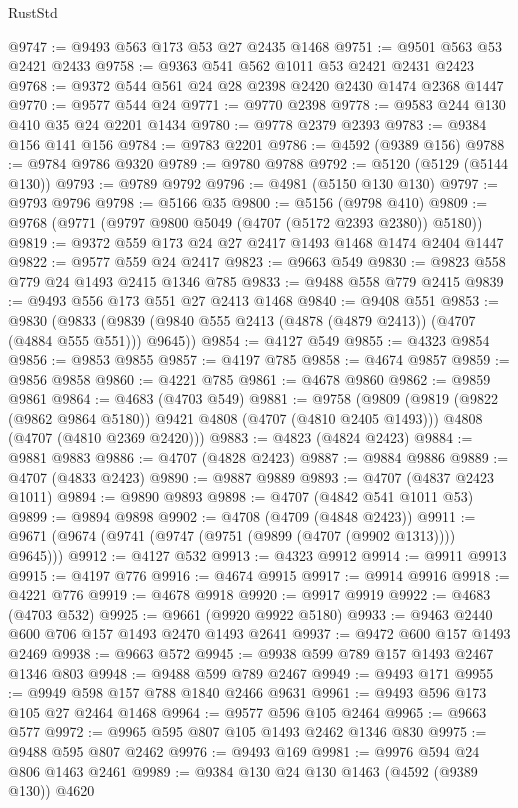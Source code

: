 \begin{lexlean}{RustStd}
\begin{coremodule}
@9747 := @9493 @563 @173 @53 @27 @2435 @1468
@9751 := @9501 @563 @53 @2421 @2433
@9758 := @9363 @541 @562 @1011 @53 @2421 @2431 @2423
@9768 := @9372 @544 @561 @24 @28 @2398 @2420 @2430 @1474 @2368 @1447
@9770 := @9577 @544 @24
@9771 := @9770 @2398
@9778 := @9583 @244 @130 @410 @35 @24 @2201 @1434
@9780 := @9778 @2379 @2393
@9783 := @9384 @156 @141 @156
@9784 := @9783 @2201
@9786 := @4592 (@9389 @156)
@9788 := @9784 @9786 @9320
@9789 := @9780 @9788
@9792 := @5120 (@5129 (@5144 @130))
@9793 := @9789 @9792
@9796 := @4981 (@5150 @130 @130)
@9797 := @9793 @9796
@9798 := @5166 @35
@9800 := @5156 (@9798 @410)
@9809 := @9768 (@9771 (@9797 @9800 @5049 (@4707 (@5172 @2393 @2380)) @5180))
@9819 := @9372 @559 @173 @24 @27 @2417 @1493 @1468 @1474 @2404 @1447
@9822 := @9577 @559 @24 @2417
@9823 := @9663 @549
@9830 := @9823 @558 @779 @24 @1493 @2415 @1346 @785
@9833 := @9488 @558 @779 @2415
@9839 := @9493 @556 @173 @551 @27 @2413 @1468
@9840 := @9408 @551
@9853 := @9830
    (@9833 (@9839 (@9840 @555 @2413 (@4878 (@4879 @2413)) (@4707 (@4884 @555 @551))) @9645))
@9854 := @4127 @549
@9855 := @4323 @9854
@9856 := @9853 @9855
@9857 := @4197 @785
@9858 := @4674 @9857
@9859 := @9856 @9858
@9860 := @4221 @785
@9861 := @4678 @9860
@9862 := @9859 @9861
@9864 := @4683 (@4703 @549)
@9881 := @9758
    (@9809
      (@9819 (@9822 (@9862 @9864 @5180)) @9421 @4808 (@4707 (@4810 @2405 @1493)))
      @4808
      (@4707 (@4810 @2369 @2420)))
@9883 := @4823 (@4824 @2423)
@9884 := @9881 @9883
@9886 := @4707 (@4828 @2423)
@9887 := @9884 @9886
@9889 := @4707 (@4833 @2423)
@9890 := @9887 @9889
@9893 := @4707 (@4837 @2423 @1011)
@9894 := @9890 @9893
@9898 := @4707 (@4842 @541 @1011 @53)
@9899 := @9894 @9898
@9902 := @4708 (@4709 (@4848 @2423))
@9911 := @9671 (@9674 (@9741 (@9747 (@9751 (@9899 (@4707 (@9902 @1313)))) @9645)))
@9912 := @4127 @532
@9913 := @4323 @9912
@9914 := @9911 @9913
@9915 := @4197 @776
@9916 := @4674 @9915
@9917 := @9914 @9916
@9918 := @4221 @776
@9919 := @4678 @9918
@9920 := @9917 @9919
@9922 := @4683 (@4703 @532)
@9925 := @9661 (@9920 @9922 @5180)
@9933 := @9463 @2440 @600 @706 @157 @1493 @2470 @1493 @2641
@9937 := @9472 @600 @157 @1493 @2469
@9938 := @9663 @572
@9945 := @9938 @599 @789 @157 @1493 @2467 @1346 @803
@9948 := @9488 @599 @789 @2467
@9949 := @9493 @171
@9955 := @9949 @598 @157 @788 @1840 @2466 @9631
@9961 := @9493 @596 @173 @105 @27 @2464 @1468
@9964 := @9577 @596 @105 @2464
@9965 := @9663 @577
@9972 := @9965 @595 @807 @105 @1493 @2462 @1346 @830
@9975 := @9488 @595 @807 @2462
@9976 := @9493 @169
@9981 := @9976 @594 @24 @806 @1463 @2461
@9989 := @9384 @130 @24 @130 @1463 (@4592 (@9389 @130)) @4620

\end{coremodule}
\end{lexlean}
